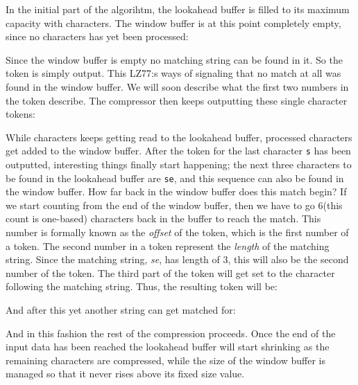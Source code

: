 In the initial part of the algorihtm, the lookahead buffer is filled
to its maximum capacity with characters. The window buffer is at this
point completely empty, since no characters has yet been processed:

\newcommand{\windowsize}{20}
\newcommand{\lookaheadsize}{10}


Since the window buffer is empty no matching string can be found in
it. So the token  is simply output. This LZ77:s ways of
signaling that no match at all was found in the window buffer. We will
soon describe what the first two numbers in the token describe. The
compressor then keeps outputting these single character tokens:


While characters keeps getting read to the lookahead buffer, processed
characters get added to the window buffer. After the token for the
last character \texttt{s} has been outputted, interesting things
finally start happening; the next three characters to be found in the
lookahead buffer are \texttt{{\spc{}se}}, and this sequence can also
be found in the window buffer. How far back in the window buffer does
this match begin? If we start counting from the end of the window
buffer, then we have to go $6$(this count is one-based) characters
back in the buffer to reach the match. This number is formally known
as the \textit{offset} of the token, which is the first number of a
token. The second number in a token represent the \textit{length} of
the matching string. Since the matching string, \textit{{\spc{}se}},
has length of $3$, this will also be the second number of the
token. The third part of the token will get set to the character
following the matching string. Thus, the resulting token will be:


And after this yet another string can get matched for:


And in this fashion the rest of the compression proceeds. Once the end
of the input data has been reached the lookahead buffer will start
shrinking as the remaining characters are compressed, while the size
of the window buffer is managed so that it never rises above its fixed
size value.

